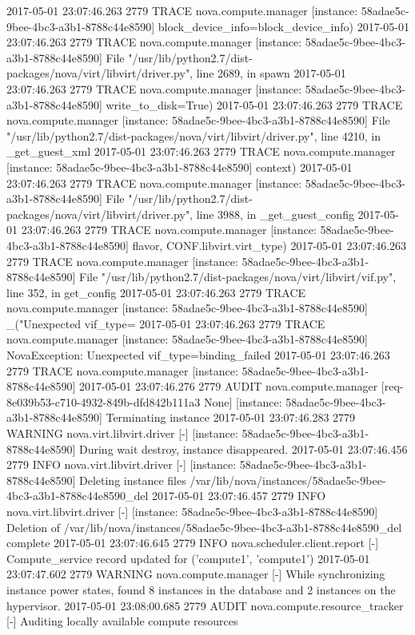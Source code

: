 \documentclass[a4paper,left=1.5cm,right=1.5cm,11pt]{article}
\begin{document}
2017-05-01 23:07:46.263 2779 TRACE nova.compute.manager [instance: 58adae5c-9bee-4bc3-a3b1-8788c44e8590]     block_device_info=block_device_info)
2017-05-01 23:07:46.263 2779 TRACE nova.compute.manager [instance: 58adae5c-9bee-4bc3-a3b1-8788c44e8590]   File "/usr/lib/python2.7/dist-packages/nova/virt/libvirt/driver.py", line 2689, in spawn
2017-05-01 23:07:46.263 2779 TRACE nova.compute.manager [instance: 58adae5c-9bee-4bc3-a3b1-8788c44e8590]     write_to_disk=True)
2017-05-01 23:07:46.263 2779 TRACE nova.compute.manager [instance: 58adae5c-9bee-4bc3-a3b1-8788c44e8590]   File "/usr/lib/python2.7/dist-packages/nova/virt/libvirt/driver.py", line 4210, in _get_guest_xml
2017-05-01 23:07:46.263 2779 TRACE nova.compute.manager [instance: 58adae5c-9bee-4bc3-a3b1-8788c44e8590]     context)
2017-05-01 23:07:46.263 2779 TRACE nova.compute.manager [instance: 58adae5c-9bee-4bc3-a3b1-8788c44e8590]   File "/usr/lib/python2.7/dist-packages/nova/virt/libvirt/driver.py", line 3988, in _get_guest_config
2017-05-01 23:07:46.263 2779 TRACE nova.compute.manager [instance: 58adae5c-9bee-4bc3-a3b1-8788c44e8590]     flavor, CONF.libvirt.virt_type)
2017-05-01 23:07:46.263 2779 TRACE nova.compute.manager [instance: 58adae5c-9bee-4bc3-a3b1-8788c44e8590]   File "/usr/lib/python2.7/dist-packages/nova/virt/libvirt/vif.py", line 352, in get_config
2017-05-01 23:07:46.263 2779 TRACE nova.compute.manager [instance: 58adae5c-9bee-4bc3-a3b1-8788c44e8590]     _("Unexpected vif_type=%
2017-05-01 23:07:46.263 2779 TRACE nova.compute.manager [instance: 58adae5c-9bee-4bc3-a3b1-8788c44e8590] NovaException: Unexpected vif_type=binding_failed
2017-05-01 23:07:46.263 2779 TRACE nova.compute.manager [instance: 58adae5c-9bee-4bc3-a3b1-8788c44e8590] 
2017-05-01 23:07:46.276 2779 AUDIT nova.compute.manager [req-8e039b53-c710-4932-849b-dfd842b111a3 None] [instance: 58adae5c-9bee-4bc3-a3b1-8788c44e8590] Terminating instance
2017-05-01 23:07:46.283 2779 WARNING nova.virt.libvirt.driver [-] [instance: 58adae5c-9bee-4bc3-a3b1-8788c44e8590] During wait destroy, instance disappeared.
2017-05-01 23:07:46.456 2779 INFO nova.virt.libvirt.driver [-] [instance: 58adae5c-9bee-4bc3-a3b1-8788c44e8590] Deleting instance files /var/lib/nova/instances/58adae5c-9bee-4bc3-a3b1-8788c44e8590_del
2017-05-01 23:07:46.457 2779 INFO nova.virt.libvirt.driver [-] [instance: 58adae5c-9bee-4bc3-a3b1-8788c44e8590] Deletion of /var/lib/nova/instances/58adae5c-9bee-4bc3-a3b1-8788c44e8590_del complete
2017-05-01 23:07:46.645 2779 INFO nova.scheduler.client.report [-] Compute_service record updated for ('compute1', 'compute1')
2017-05-01 23:07:47.602 2779 WARNING nova.compute.manager [-] While synchronizing instance power states, found 8 instances in the database and 2 instances on the hypervisor.
2017-05-01 23:08:00.685 2779 AUDIT nova.compute.resource_tracker [-] Auditing locally available compute resources
\end{document}
